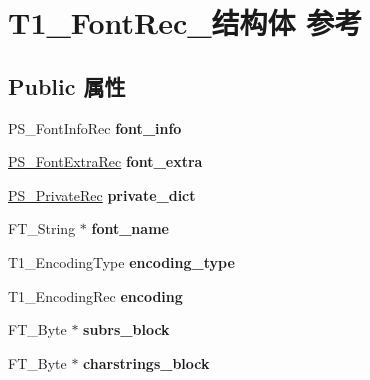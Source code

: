 \hypertarget{struct_t1___font_rec__}{}\section{T1\+\_\+\+Font\+Rec\+\_\+结构体 参考}
\label{struct_t1___font_rec__}
\subsection*{Public 属性}
\begin{DoxyCompactItemize}
\item 
\mbox{\label{struct_t1___font_rec___a38098edc6279f539983e0d4694b9949a}} 
P\+S\+\_\+\+Font\+Info\+Rec {\bfseries font\+\_\+info}
\item 
\mbox{\label{struct_t1___font_rec___a8f2f0990ef8ab29e961047b8c2ceca0d}} 
\hyperlink{struct_p_s___font_extra_rec__}{P\+S\+\_\+\+Font\+Extra\+Rec} {\bfseries font\+\_\+extra}
\item 
\mbox{\label{struct_t1___font_rec___a14386570a1b12e477407836e470a258f}} 
\hyperlink{struct_p_s___private_rec__}{P\+S\+\_\+\+Private\+Rec} {\bfseries private\+\_\+dict}
\item 
\mbox{\label{struct_t1___font_rec___a878fc12d0ddda382ffc09c27a7ed81ad}} 
F\+T\+\_\+\+String $\ast$ {\bfseries font\+\_\+name}
\item 
\mbox{\label{struct_t1___font_rec___a20cb798239623daa4ac7fe833a2a9dc9}} 
T1\+\_\+\+Encoding\+Type {\bfseries encoding\+\_\+type}
\item 
\mbox{\label{struct_t1___font_rec___a78de0ca49e25ea59a2736ec5837c77b4}} 
T1\+\_\+\+Encoding\+Rec {\bfseries encoding}
\item 
\mbox{\label{struct_t1___font_rec___a46675e2cba990def15e0ea01b11578a7}} 
F\+T\+\_\+\+Byte $\ast$ {\bfseries subrs\+\_\+block}
\item 
\mbox{\label{struct_t1___font_rec___a8985630587cf6364837fe172391cfadb}} 
F\+T\+\_\+\+Byte $\ast$ {\bfseries charstrings\+\_\+block}

\end{DoxyCompactItemize}
